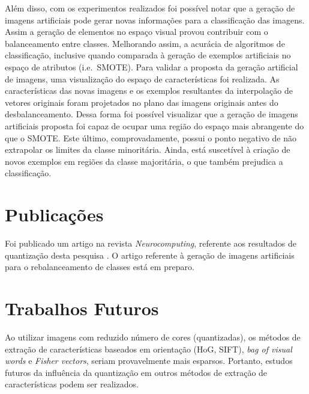 Além disso, com os experimentos realizados foi possível notar que a geração de imagens artificiais pode gerar novas informações para a classificação das imagens. Assim a geração de elementos no espaço visual provou contribuir com o balanceamento entre classes. Melhorando assim, a acurácia de algoritmos de classificação, inclusive quando comparada à geração de exemplos artificiais no espaço de atributos (i.e.\ SMOTE). Para validar a proposta da geração artificial de imagens, uma visualização do espaço de características foi realizada. As características das novas imagens e os exemplos resultantes da interpolação de vetores originais foram projetados no plano das imagens originais antes do desbalanceamento. Dessa forma foi possível visualizar que a geração de imagens artificiais proposta foi capaz de ocupar uma região do espaço mais abrangente do que o SMOTE. Este último, comprovadamente, possui o ponto negativo de não extrapolar os limites da classe minoritária. Ainda, está suscetível à criação de novos exemplos em regiões da classe majoritária, o que também prejudica a classificação.

\section{Publicações}

Foi publicado um artigo na revista \textit{Neurocomputing}, referente aos resultados de quantização desta pesquisa \cite{Ponti2016}. O artigo referente à geração de imagens artificiais para o rebalanceamento de classes está em preparo.


\section{Trabalhos Futuros}

Ao utilizar imagens com reduzido número de cores (quantizadas), os métodos de extração de características baseados em orientação (HoG, SIFT), \textit{bag of visual words} e \textit{Fisher vectors}, seriam provavelmente mais esparsos. Portanto, estudos futuros da influência da quantização em outros métodos de extração de características podem ser realizados.


